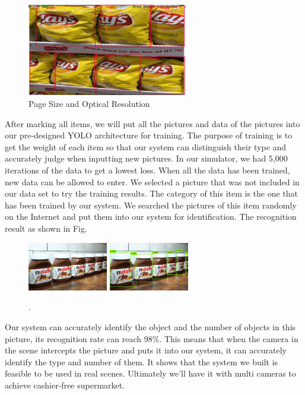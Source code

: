 \begin{figure}[htbp]
\centerline{\includegraphics[width=7cm,scale=0.8]{LaysMarked.jpg}}
\caption{Page Size and Optical Resolution}
\label{fig}
\end{figure}

After marking all items, we will put all the pictures and data of the pictures into our pre-designed YOLO architecture for training. 
The purpose of training is to get the weight of each item so that our system can distinguish their type and accurately judge when inputting new pictures.
In our simulator, we had 5,000 iterations of the data to get a lowest loss.
When all the data has been trained, new data can be allowed to enter.
We selected a picture that was not included in our data set to try the training results.
The category of this item is the one that has been trained by our system. 
We searched the pictures of this item randomly on the Internet and put them into our system for identification. 
The recognition result as shown in Fig.

\begin{figure}[htbp]
\centerline{\includegraphics[width=3.5cm,scale=0.6]{nutella.jpg} \includegraphics[width=3.5cm,scale=0.6]{nutella2.jpg}}
\caption{.}
\label{fig}
\end{figure}

Our system can accurately identify the object and the number of objects in this picture, its recognition rate can reach 98\%.
This means that when the camera in the scene intercepts the picture and puts it into our system, it can accurately identify the type and number of them.
It shows that the system we built is feasible to be used in real scenes.
Ultimately we'll have it with multi cameras to achieve cashier-free supermarket.
